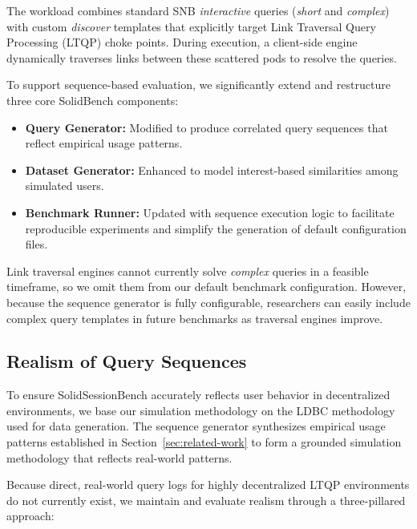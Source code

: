 The workload combines standard SNB \textit{interactive} queries (\textit{short} and \textit{complex})
with custom \textit{discover} templates that explicitly target
Link Traversal Query Processing (LTQP) choke points.
During execution, a client-side engine dynamically traverses links
between these scattered pods to resolve the queries.

To support sequence-based evaluation, we significantly extend and restructure three core SolidBench components:
\begin{itemize}
    \item \textbf{Query Generator:} Modified to produce correlated query sequences
    that reflect empirical usage patterns.
    \item \textbf{Dataset Generator:} Enhanced to model interest-based similarities
    among simulated users.
    \item \textbf{Benchmark Runner:} Updated with sequence execution logic to facilitate
    reproducible experiments and simplify the generation of default configuration files.
\end{itemize}

Link traversal engines cannot currently solve \textit{complex} queries in a feasible timeframe,
so we omit them from our default benchmark configuration.
However, because the sequence generator is fully configurable,
researchers can easily include complex query templates in future benchmarks
as traversal engines improve.


\subsection{Realism of Query Sequences}
To ensure SolidSessionBench accurately reflects user behavior in decentralized environments, 
we base our simulation methodology on the LDBC methodology used for data generation.
The sequence generator synthesizes empirical usage patterns established in Section~\ref{sec:related-work} to form a 
grounded simulation methodology that reflects real-world patterns.

Because direct, real-world query logs for highly decentralized LTQP environments do not currently exist,
we maintain and evaluate realism through a three-pillared approach:

